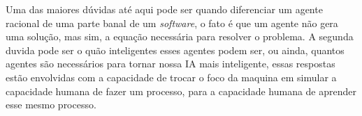 Uma das maiores dúvidas até aqui pode ser quando diferenciar um agente racional de uma parte banal de um \textit{software}, o fato é que um agente não gera uma solução, mas sim, a equação necessária para resolver o problema. A segunda duvida pode ser o quão inteligentes esses agentes podem ser, ou ainda, quantos agentes são necessários para tornar nossa IA mais inteligente, essas respostas estão envolvidas com a capacidade de trocar o foco da maquina em simular a capacidade humana de fazer um processo, para a capacidade humana de aprender esse mesmo processo.